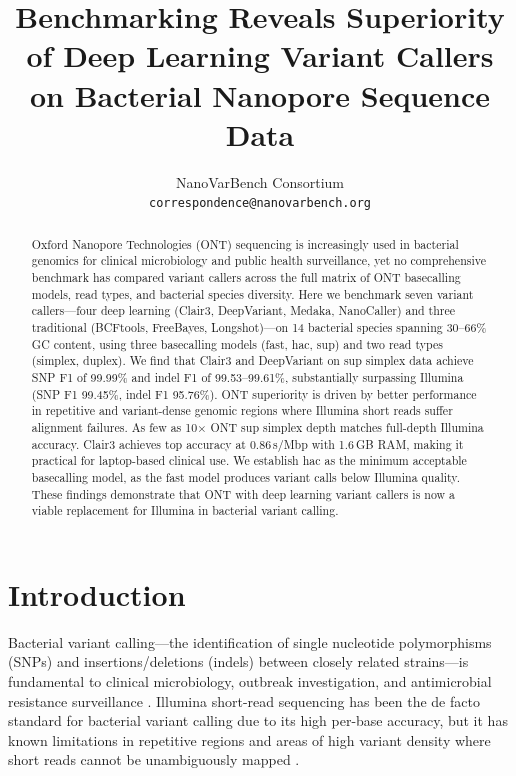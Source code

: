 \documentclass[11pt]{article}
\title{Benchmarking Reveals Superiority of Deep Learning Variant Callers on Bacterial Nanopore Sequence Data}
\author{%
  NanoVarBench Consortium\\
  \texttt{correspondence@nanovarbench.org}
}
\date{}
\begin{document}
\maketitle

\begin{abstract}
Oxford Nanopore Technologies (ONT) sequencing is increasingly used in bacterial genomics for clinical microbiology and public health surveillance, yet no comprehensive benchmark has compared variant callers across the full matrix of ONT basecalling models, read types, and bacterial species diversity. Here we benchmark seven variant callers---four deep learning (Clair3, DeepVariant, Medaka, NanoCaller) and three traditional (BCFtools, FreeBayes, Longshot)---on 14 bacterial species spanning 30--66\% GC content, using three basecalling models (fast, hac, sup) and two read types (simplex, duplex). We find that Clair3 and DeepVariant on sup simplex data achieve SNP F1 of 99.99\% and indel F1 of 99.53--99.61\%, substantially surpassing Illumina (SNP F1 99.45\%, indel F1 95.76\%). ONT superiority is driven by better performance in repetitive and variant-dense genomic regions where Illumina short reads suffer alignment failures. As few as 10$\times$ ONT sup simplex depth matches full-depth Illumina accuracy. Clair3 achieves top accuracy at 0.86\,s/Mbp with 1.6\,GB RAM, making it practical for laptop-based clinical use. We establish hac as the minimum acceptable basecalling model, as the fast model produces variant calls below Illumina quality. These findings demonstrate that ONT with deep learning variant callers is now a viable replacement for Illumina in bacterial variant calling.
\end{abstract}

\section{Introduction}

Bacterial variant calling---the identification of single nucleotide polymorphisms (SNPs) and insertions/deletions (indels) between closely related strains---is fundamental to clinical microbiology, outbreak investigation, and antimicrobial resistance surveillance \citep{didelot2012,gardy2018}. Illumina short-read sequencing has been the de facto standard for bacterial variant calling due to its high per-base accuracy, but it has known limitations in repetitive regions and areas of high variant density where short reads cannot be unambiguously mapped \citep{treangen2012}.
\end{document}

